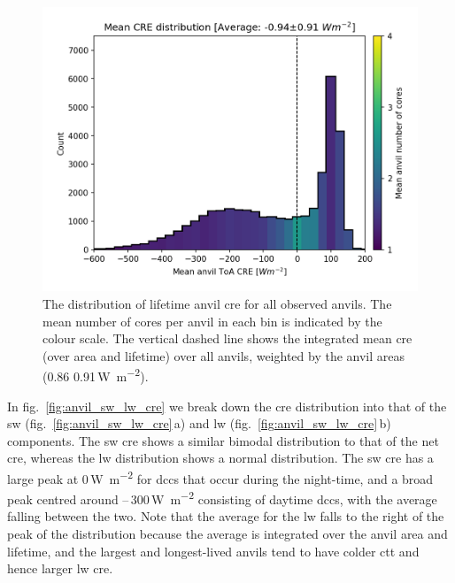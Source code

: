 \documentclass[acp, manuscript]{copernicus}
\begin{document}
\begin{figure}[tp]
    \includegraphics[width=12cm]{figures/fig11.png}
    \caption[
    The distribution of lifetime anvil \acrshort{cre} for all observed anvils
    ]{
    The distribution of lifetime anvil \acrshort{cre} for all observed anvils. The mean number of cores per anvil in each bin is indicated by the colour scale. The vertical dashed line shows the integrated mean \acrshort{cre} (over area and lifetime) over all anvils, weighted by the anvil areas (0.86\,\textpm\,0.91\,\unit{W m^{-2}}).
    }
    \label{fig:anvil_cre_dist}
\end{figure}


In fig.~\ref{fig:anvil_sw_lw_cre} we break down the \acrshort{cre} distribution into that of the \acrshort{sw} (fig.~\ref{fig:anvil_sw_lw_cre}\,a) and \acrshort{lw} (fig.~\ref{fig:anvil_sw_lw_cre}\,b) components. 
The \acrshort{sw} \acrshort{cre} shows a similar bimodal distribution to that of the net \acrshort{cre}, whereas the \acrshort{lw} distribution shows a normal distribution. 
The \acrshort{sw} \acrshort{cre} has a large peak at 0\,\unit{W m^{-2}} for \acrshort{dcc}s that occur during the night-time, and a broad peak centred around --\,300\,\unit{W m^{-2}} consisting of daytime \acrshort{dcc}s, with the average falling between the two. 
Note that the average for the \acrshort{lw} falls to the right of the peak of the distribution because the average is integrated over the anvil area and lifetime, and the largest and longest-lived anvils tend to have colder \acrshort{ctt} and hence larger \acrshort{lw} \acrshort{cre}.
\end{document}
